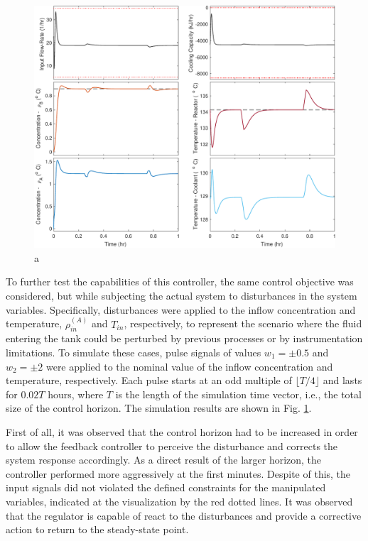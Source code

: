 \documentclass[a4paper,11pt]{book}
\numberwithin{figure}{chapter}
\numberwithin{equation}{chapter}
\numberwithin{table}{chapter}
\theoremstyle{definition}
\begin{document}
\begin{figure}[ht] \centering
	\includegraphics[width=\textwidth]{chapter7/lqr02}
	
	\caption{a}
	\label{fig:lqr02}
\end{figure}	

To further test the capabilities of this controller, the same control objective was considered, but while subjecting the actual system to disturbances in the system variables. Specifically, disturbances were applied to the inflow concentration and temperature, $\rho^{(A)}_{in}$ and $T_{in}$, respectively, to represent the scenario where the fluid entering the tank could be perturbed by previous processes or by instrumentation limitations. To simulate these cases, pulse signals of values $w_1 = \pm 0.5$ and $w_2 = \pm 2$ were applied to the nominal value of the inflow concentration and temperature, respectively. Each pulse starts at an odd multiple of $\lfloor T/4 \rfloor$ and lasts for $0.02T$ hours, where $T$ is the length of the simulation time vector, i.e., the total size of the control horizon. The simulation results are shown in Fig. \ref{fig:lqr02}.

First of all, it was observed that the control horizon had to be increased in order to allow the feedback controller to perceive the disturbance and corrects the system response accordingly. As a direct result of the larger horizon, the controller performed more aggressively at the first minutes. Despite of this, the input signals did not violated the defined constraints for the manipulated variables, indicated at the visualization by the red dotted lines. It was observed that the regulator is capable of react to the disturbances and provide a corrective action to return to the steady-state point. 
\end{document}
